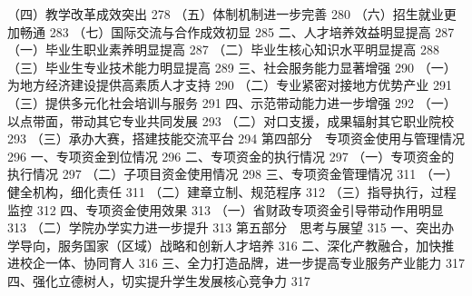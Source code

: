 （四）教学改革成效突出	278
（五）体制机制进一步完善	280
（六）招生就业更加畅通	283
（七）国际交流与合作成效初显	285
二、人才培养效益明显提高	287
（一）毕业生职业素养明显提高	287
（二）毕业生核心知识水平明显提高	288
（三）毕业生专业技术能力明显提高	289
三、社会服务能力显著增强	290
（一）为地方经济建设提供高素质人才支持	290
（二）专业紧密对接地方优势产业	291
（三）提供多元化社会培训与服务	291
四、示范带动能力进一步增强	292
（一）以点带面，带动其它专业共同发展	293
（二）对口支援，成果辐射其它职业院校	293
（三）承办大赛，搭建技能交流平台	294
第四部分　专项资金使用与管理情况	296
一、专项资金到位情况	296
二、专项资金的执行情况	297
（一）专项资金的执行情况	297
（二）子项目资金使用情况	298
三、专项资金管理情况	311
（一）健全机构，细化责任	311
（二）建章立制、规范程序	312
（三）指导执行，过程监控	312
四、专项资金使用效果	313
（一）省财政专项资金引导带动作用明显	313
（二）学院办学实力进一步提升	313
第五部分　思考与展望	315
一、突出办学导向，服务国家（区域）战略和创新人才培养	316
二、深化产教融合，加快推进校企一体、协同育人	316
三、全力打造品牌，进一步提高专业服务产业能力	317
四、强化立德树人，切实提升学生发展核心竞争力	317

